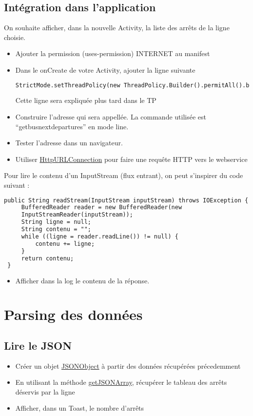 \documentclass{article}
\begin{document}
\subsection{Intégration dans l'application} 
On souhaite afficher, dans la nouvelle Activity, la liste des arrêts de la ligne
choisie.
\begin{itemize} 
  \item Ajouter la permission (uses-permission) INTERNET au manifest
  \item Dans le onCreate de votre Activity, ajouter la ligne suivante 
\begin{lstlisting}[language=XML]
StrictMode.setThreadPolicy(new ThreadPolicy.Builder().permitAll().build());
\end{lstlisting}
Cette ligne sera expliquée plus tard dans le TP
  \item Construire l'adresse qui sera appellée. La commande utilisée est
  ``getbusnextdepartures'' en mode line.
  \item Tester l'adresse dans un navigateur.
  \item Utiliser
  \href{http://developer.android.com/reference/java/net/HttpURLConnection.html}{HttpURLConnection} pour faire une requête HTTP vers le webservice
\end{itemize}
Pour lire le contenu d'un InputStream (flux entrant), on peut s'inspirer du code
suivant :
 \begin{lstlisting}[language=XML]
 public String readStream(InputStream inputStream) throws IOException {
     BufferedReader reader = new BufferedReader(new
     InputStreamReader(inputStream)); 
     String ligne = null;
     String contenu = "";
     while ((ligne = reader.readLine()) != null) {
         contenu += ligne;
     }
     return contenu;
 }
\end{lstlisting}
\begin{itemize} 
  \item Afficher dans la log le contenu de la réponse.
\end{itemize}
\section{Parsing des données}
\subsection{Lire le JSON}
\begin{itemize} 
  \item Créer un objet
  \href{http://developer.android.com/reference/org/json/JSONObject.html}{JSONObject}
  à partir des données récupérées précedemment
  \item En utilisant la méthode
  \href{http://developer.android.com/reference/org/json/JSONObject.html#getJSONArray(java.lang.String)}{getJSONArray},
  récupérer le tableau des arrêts déservis par la ligne
  \item Afficher, dans un Toast, le nombre d'arrêts
\end{itemize}
\end{document}

